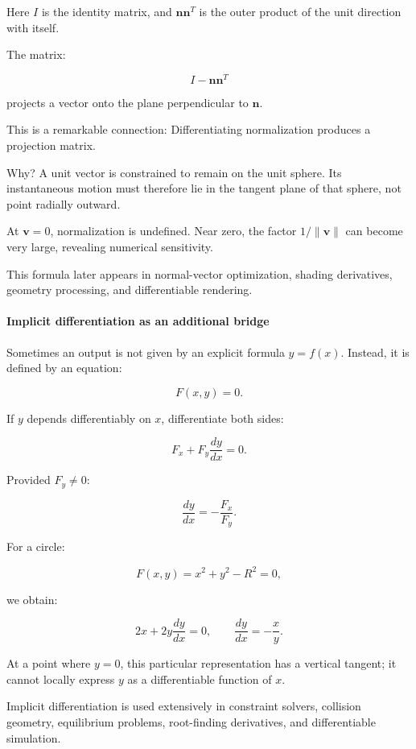 Here \(I\) is the identity matrix, and \(\mathbf n\mathbf n^T\) is the outer product of the unit direction with itself.

The matrix:

\[
I-\mathbf n\mathbf n^T
\]

projects a vector onto the plane perpendicular to \(\mathbf n\).

This is a remarkable connection: Differentiating normalization produces a projection matrix.

Why? A unit vector is constrained to remain on the unit sphere. Its instantaneous motion must therefore lie in the tangent plane of that sphere, not point radially outward.

At \(\mathbf v=0\), normalization is undefined. Near zero, the factor \(1/\|\mathbf v\|\) can become very large, revealing numerical sensitivity.

This formula later appears in normal-vector optimization, shading derivatives, geometry processing, and differentiable rendering.

\paragraph{Implicit differentiation as an additional bridge}\label{02-foundations-ii-ch021-implicit-differentiation-as-an-additional-bridge}

Sometimes an output is not given by an explicit formula \(y=f(x)\). Instead, it is defined by an equation:

\[
F(x,y)=0.
\]

If \(y\) depends differentiably on \(x\), differentiate both sides:

\[
F_x+F_y\frac{dy}{dx}=0.
\]

Provided \(F_y\ne0\):

\[
\boxed{\frac{dy}{dx}=-\frac{F_x}{F_y}}.
\]

For a circle:

\[
F(x,y)=x^2+y^2-R^2=0,
\]

we obtain:

\[
2x+2y\frac{dy}{dx}=0, \qquad \frac{dy}{dx}=-\frac xy.
\]

At a point where \(y=0\), this particular representation has a vertical tangent; it cannot locally express \(y\) as a differentiable function of \(x\).

Implicit differentiation is used extensively in constraint solvers, collision geometry, equilibrium problems, root-finding derivatives, and differentiable simulation.

